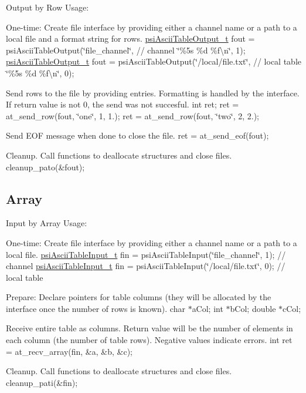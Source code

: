 Output by Row Usage\+:
\begin{DoxyEnumerate}
\item One-\/time\+: Create file interface by providing either a channel name or a path to a local file and a format string for rows. \hyperlink{structpsiAsciiTableOutput__t}{psi\+Ascii\+Table\+Output\+\_\+t} fout = psi\+Ascii\+Table\+Output(\char`\"{}file\+\_\+channel\char`\"{}, // channel \char`\"{}\%5s \%d \%f\textbackslash{}n\char`\"{}, 1); \hyperlink{structpsiAsciiTableOutput__t}{psi\+Ascii\+Table\+Output\+\_\+t} fout = psi\+Ascii\+Table\+Output(\char`\"{}/local/file.\+txt\char`\"{}, // local table \char`\"{}\%5s \%d \%f\textbackslash{}n\char`\"{}, 0);
\item Send rows to the file by providing entries. Formatting is handled by the interface. If return value is not 0, the send was not succesful. int ret; ret = at\+\_\+send\+\_\+row(fout, \char`\"{}one\char`\"{}, 1, 1.); ret = at\+\_\+send\+\_\+row(fout, \char`\"{}two\char`\"{}, 2, 2.);
\item Send E\+OF message when done to close the file. ret = at\+\_\+send\+\_\+eof(fout);
\item Cleanup. Call functions to deallocate structures and close files. cleanup\+\_\+pato(\&fout);
\end{DoxyEnumerate}

\subsection*{Array }

Input by Array Usage\+:
\begin{DoxyEnumerate}
\item One-\/time\+: Create file interface by providing either a channel name or a path to a local file. \hyperlink{structpsiAsciiTableInput__t}{psi\+Ascii\+Table\+Input\+\_\+t} fin = psi\+Ascii\+Table\+Input(\char`\"{}file\+\_\+channel\char`\"{}, 1); // channel \hyperlink{structpsiAsciiTableInput__t}{psi\+Ascii\+Table\+Input\+\_\+t} fin = psi\+Ascii\+Table\+Input(\char`\"{}/local/file.\+txt\char`\"{}, 0); // local table
\item Prepare\+: Declare pointers for table columns (they will be allocated by the interface once the number of rows is known). char $\ast$a\+Col; int $\ast$b\+Col; double $\ast$c\+Col;
\item Receive entire table as columns. Return value will be the number of elements in each column (the number of table rows). Negative values indicate errors. int ret = at\+\_\+recv\+\_\+array(fin, \&a, \&b, \&c);
\item Cleanup. Call functions to deallocate structures and close files. cleanup\+\_\+pati(\&fin);
\end{DoxyEnumerate}


